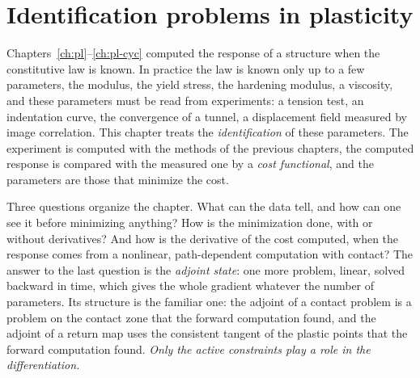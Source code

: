 \chapter{Identification problems in plasticity}\label{ch:id}

Chapters~\ref{ch:pl}--\ref{ch:pl-cyc} computed the response of a structure
when the constitutive law is known. In practice the law is known only up to a
few parameters, the modulus, the yield stress, the hardening modulus, a
viscosity, and these parameters must be read from experiments: a tension test,
an indentation curve, the convergence of a tunnel, a displacement field
measured by image correlation. This chapter treats the \emph{identification}
of these parameters. The experiment is computed with the methods of the
previous chapters, the computed response is compared with the measured one by
a \emph{cost functional}, and the parameters are those that minimize the cost.

Three questions organize the chapter. What can the data tell, and how can one
see it before minimizing anything? How is the minimization done, with or
without derivatives? And how is the derivative of the cost computed, when the
response comes from a nonlinear, path-dependent computation with contact? The
answer to the last question is the \emph{adjoint state}: one more problem,
linear, solved backward in time, which gives the whole gradient whatever the
number of parameters. Its structure is the familiar one: the adjoint of a
contact problem is a problem on the contact zone that the forward computation
found, and the adjoint of a return map uses the consistent tangent of the
plastic points that the forward computation found. \emph{Only the active
constraints play a role in the differentiation.}

